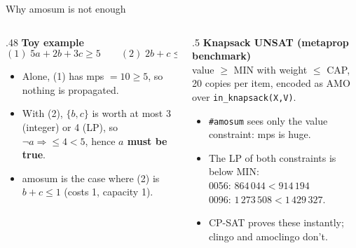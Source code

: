 \documentclass[aspectratio=169,11pt]{beamer}
\begin{document}
\begin{frame}{Why amosum is not enough}
\footnotesize
\begin{columns}[T]
\begin{column}{.48\textwidth}
\textbf{Toy example}
\[
(1)\; 5a + 2b + 3c \ge 5 \qquad (2)\; 2b + c \le 2
\]
\begin{itemize}\setlength\itemsep{1pt}
\item Alone, (1) has mps $= 10 \ge 5$, so nothing is propagated.
\item With (2), $\{b,c\}$ is worth at most 3 (integer) or 4 (LP), so $\neg a \Rightarrow \le 4 < 5$, hence \textbf{$a$ must be true}.
\item amosum is the case where (2) is $b + c \le 1$ (costs 1, capacity 1).
\end{itemize}
\end{column}
\begin{column}{.5\textwidth}
\textbf{Knapsack UNSAT (metaprop benchmark)}\\[1mm]
value $\ge$ MIN with weight $\le$ CAP, 20 copies per item, encoded as AMO over \texttt{in\_knapsack(X,V)}.
\begin{itemize}\setlength\itemsep{1pt}
\item \texttt{\#amosum} sees only the value constraint: mps is huge.
\item The LP of both constraints is below MIN:\\
  0056: $864\,044 < 914\,194$\\
  0096: $1\,273\,508 < 1\,429\,327$.
\item CP-SAT proves these instantly; clingo and amoclingo don't.
\end{itemize}
\end{column}
\end{columns}
\end{frame}
\end{document}
